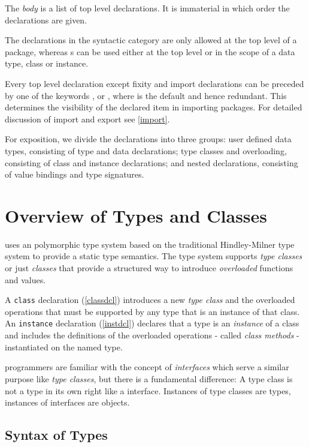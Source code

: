 
The \emph{body} is a list of top level declarations. It is immaterial in which order the declarations are given.

The declarations in the syntactic category  are only allowed at the top level of a \frege{} package, whereas s can be used either at the top level or in the scope of a data type, class or instance.

Every top level declaration except fixity and import declarations can be preceded by one of the keywords ,  or , where  is the default and hence redundant. This determines the visibility of the declared item in importing packages. For detailed discussion of import and export see \autoref{import}.

For exposition, we divide the declarations into three groups: user defined data types, consisting of type and data declarations; type classes and overloading, consisting of class and instance declarations; and nested declarations, consisting of value bindings and type signatures.

\section{Overview of Types and Classes}
\frege{} uses an polymorphic type system based on the traditional Hindley-Milner type system \cite{ptifart} to provide a static type semantics. The type system supports \emph{type classes} or just \emph{classes} that provide a structured way to introduce \emph{overloaded} functions and values.

A \texttt{class} declaration (\autoref{classdcl}) introduces a new \emph{type class} and the overloaded operations that must be supported by any type that is an instance of that class. An \texttt{instance} declaration (\autoref{instdcl}) declares that a type is an \emph{instance} of a class and includes the definitions of the overloaded operations - called \emph{class methods} - instantiated on the named type.  

\java{} programmers are familiar with the concept of \emph{interfaces} which serve a similar purpose like \emph{type classes}, but there is a fundamental difference: A \frege{} type class is not a type in its own right like a \java{} interface. Instances of type classes are types, instances of \java{} interfaces are objects.

\subsection{Syntax of Types}   \label{typesyntax}

